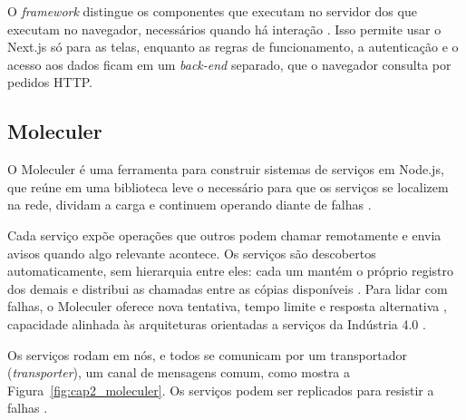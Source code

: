 \par O \emph{framework} distingue os componentes que executam no servidor dos que executam no navegador, necessários quando há interação \cite{NEXTJS_DOCS}. Isso permite usar o Next.js só para as telas, enquanto as regras de funcionamento, a autenticação e o acesso aos dados ficam em um \emph{back-end} separado, que o navegador consulta por pedidos HTTP.

\subsection{Moleculer}

\par O Moleculer é uma ferramenta para construir sistemas de serviços em Node.js, que reúne em uma biblioteca leve o necessário para que os serviços se localizem na rede, dividam a carga e continuem operando diante de falhas \cite{MOLECULER_DOCS}.

\par Cada serviço expõe operações que outros podem chamar remotamente e envia avisos quando algo relevante acontece. Os serviços são descobertos automaticamente, sem hierarquia entre eles: cada um mantém o próprio registro dos demais e distribui as chamadas entre as cópias disponíveis \cite{MOLECULER_DOCS,BIGHETI2020}. Para lidar com falhas, o Moleculer oferece nova tentativa, tempo limite e resposta alternativa \cite{MOLECULER_DOCS}, capacidade alinhada às arquiteturas orientadas a serviços da Indústria 4.0 \cite{BIGHETI2020}.

\par Os serviços rodam em nós, e todos se comunicam por um transportador (\emph{transporter}), um canal de mensagens comum, como mostra a Figura~\ref{fig:cap2_moleculer}. Os serviços podem ser replicados para resistir a falhas \cite{BIGHETI2020}.


